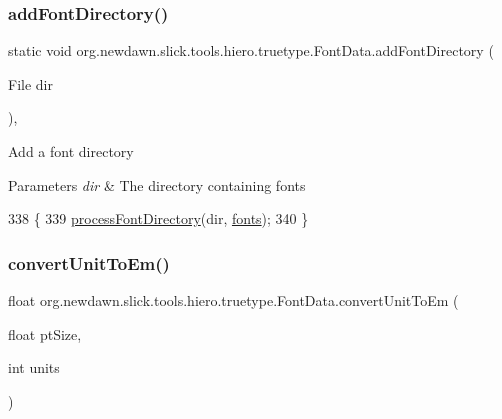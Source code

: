 \subsubsection{\texorpdfstring{add\+Font\+Directory()}{addFontDirectory()}}
{\footnotesize\ttfamily static void org.\+newdawn.\+slick.\+tools.\+hiero.\+truetype.\+Font\+Data.\+add\+Font\+Directory (\begin{DoxyParamCaption}\item[{File}]{dir }\end{DoxyParamCaption})\hspace{0.3cm}{\ttfamily [inline]}, {\ttfamily [static]}}

Add a font directory


\begin{DoxyParams}{Parameters}
{\em dir} & The directory containing fonts \\
\hline
\end{DoxyParams}

\begin{DoxyCode}
338                                                   \{
339         \mbox{\hyperlink{classorg_1_1newdawn_1_1slick_1_1tools_1_1hiero_1_1truetype_1_1_font_data_a8c35c1c3236ac00f0639ae1947656d28}{processFontDirectory}}(dir, \mbox{\hyperlink{classorg_1_1newdawn_1_1slick_1_1tools_1_1hiero_1_1truetype_1_1_font_data_af5a135e5f654e01a6d82aa58a37d8b24}{fonts}});
340     \}
\end{DoxyCode}
\mbox{\label{classorg_1_1newdawn_1_1slick_1_1tools_1_1hiero_1_1truetype_1_1_font_data_ae82293147d863b46f9c3d52cfc75771b}} 
\subsubsection{\texorpdfstring{convert\+Unit\+To\+Em()}{convertUnitToEm()}}
{\footnotesize\ttfamily float org.\+newdawn.\+slick.\+tools.\+hiero.\+truetype.\+Font\+Data.\+convert\+Unit\+To\+Em (\begin{DoxyParamCaption}\item[{float}]{pt\+Size,  }\item[{int}]{units }\end{DoxyParamCaption})\hspace{0.3cm}{\ttfamily [inline]}}

